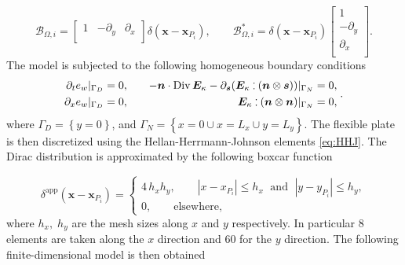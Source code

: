 \begin{equation*}
\mathcal{B}_{\Omega, i} =
\begin{bmatrix}
1 & -\partial_y & \partial_x \\
\end{bmatrix} \delta(\bm{x} - \bm{x}_{P_i}), \qquad 
\mathcal{B}_{\Omega, i}^* = \delta(\bm{x} - \bm{x}_{P_i}) \begin{bmatrix}
1 \\
-\partial_y \\
\partial_x \\
\end{bmatrix}.
\end{equation*} 
The model is subjected to the following homogeneous boundary conditions
\begin{align*}
\begin{aligned}
\partial_t e_w|_{\Gamma_D} &= 0, \\
\partial_x e_w|_{\Gamma_D} &= 0, \\
\end{aligned} \qquad 
\begin{aligned}
-\bm{n} \cdot \Div \bm{E}_\kappa - \partial_{\bm{s}} (\bm{E}_\kappa \cddot (\bm{n} \otimes \bm{s}))|_{\Gamma_N}&=0,\\
\bm{E}_\kappa \cddot (\bm{n}\otimes \bm{n})|_{\Gamma_N}&=0, \; \\
\end{aligned} .
\end{align*}
where ${\Gamma_D} = \left\{y = 0 \right\}$, and ${\Gamma_N} = \left\{x = 0 \cup x=L_x \cup y=L_y \right\}$. The flexible plate is then discretized using the Hellan-Herrmann-Johnson elements \ref{eq:HHJ}. The Dirac distribution is approximated by the following boxcar function

\begin{equation}
\delta^{\text{app}}(\bm{x} - \bm{x}_{P_i}) =
\begin{cases}
4 \, h_x h_y, \qquad |x - x_{P_i}| \le h_x \; \text{ and } \; |y - y_{P_i}| \le h_y, \\
0, \qquad \text{elsewhere},
\end{cases}  
\end{equation}
where $h_x, \; h_y$ are the mesh sizes along $x$ and $y$ respectively. In particular 8 elements are taken along the $x$ direction and 60 for the $y$ direction. The following finite-dimensional model is then obtained

